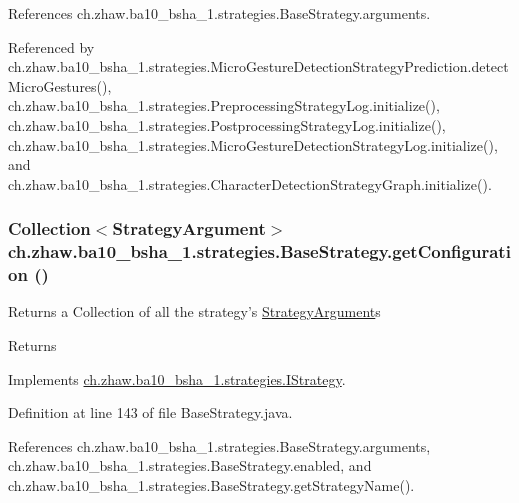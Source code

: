 References ch.zhaw.ba10\_\-bsha\_\-1.strategies.BaseStrategy.arguments.

Referenced by ch.zhaw.ba10\_\-bsha\_\-1.strategies.MicroGestureDetectionStrategyPrediction.detectMicroGestures(), ch.zhaw.ba10\_\-bsha\_\-1.strategies.PreprocessingStrategyLog.initialize(), ch.zhaw.ba10\_\-bsha\_\-1.strategies.PostprocessingStrategyLog.initialize(), ch.zhaw.ba10\_\-bsha\_\-1.strategies.MicroGestureDetectionStrategyLog.initialize(), and ch.zhaw.ba10\_\-bsha\_\-1.strategies.CharacterDetectionStrategyGraph.initialize().\hypertarget{classch_1_1zhaw_1_1ba10__bsha__1_1_1strategies_1_1BaseStrategy_a38329740106081e084162fb2e2c25f07}{
\subsubsection[{getConfiguration}]{\setlength{\rightskip}{0pt plus 5cm}Collection$<${\bf StrategyArgument}$>$ ch.zhaw.ba10\_\-bsha\_\-1.strategies.BaseStrategy.getConfiguration ()}}
\label{classch_1_1zhaw_1_1ba10__bsha__1_1_1strategies_1_1BaseStrategy_a38329740106081e084162fb2e2c25f07}
Returns a Collection of all the strategy's \hyperlink{classch_1_1zhaw_1_1ba10__bsha__1_1_1StrategyArgument}{StrategyArgument}s

\begin{DoxyReturn}{Returns}

\end{DoxyReturn}


Implements \hyperlink{interfacech_1_1zhaw_1_1ba10__bsha__1_1_1strategies_1_1IStrategy_aa03517aa764bf207ef9fccc86102ca85}{ch.zhaw.ba10\_\-bsha\_\-1.strategies.IStrategy}.

Definition at line 143 of file BaseStrategy.java.

References ch.zhaw.ba10\_\-bsha\_\-1.strategies.BaseStrategy.arguments, ch.zhaw.ba10\_\-bsha\_\-1.strategies.BaseStrategy.enabled, and ch.zhaw.ba10\_\-bsha\_\-1.strategies.BaseStrategy.getStrategyName().

